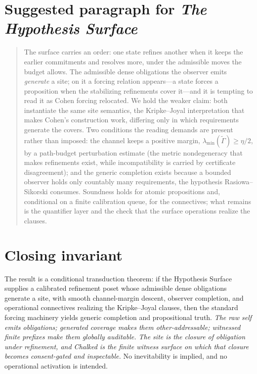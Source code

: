 \documentclass[11pt]{article}
\theoremstyle{definition}
\theoremstyle{remark}
\begin{document}
\section{Suggested paragraph for \emph{The Hypothesis Surface}}

\begin{quote}
The surface carries an order: one state refines another when it keeps the earlier commitments and
resolves more, under the admissible moves the budget allows. The admissible dense obligations the
observer emits \emph{generate} a site; on it a forcing relation appears---a state forces a proposition
when the stabilizing refinements cover it---and it is tempting to read it as Cohen forcing relocated.
We hold the weaker claim: both instantiate the same site semantics, the Kripke--Joyal interpretation
that makes Cohen's construction work, differing only in which requirements generate the covers. Two
conditions the reading demands are present rather than imposed: the channel keeps a positive margin,
$\lambda_{\min}(\tilde\Gamma)\ge\eta/2$, by a path-budget perturbation estimate (the metric nondegeneracy
that makes refinements exist, while incompatibility is carried by certificate disagreement); and the
generic completion exists because a bounded observer holds only countably many requirements, the
hypothesis Rasiowa--Sikorski consumes. Soundness holds for atomic propositions and, conditional on a
finite calibration queue, for the connectives; what remains is the quantifier layer and the check that
the surface operations realize the clauses.
\end{quote}

\section*{Closing invariant}

The result is a conditional transduction theorem: if the Hypothesis Surface supplies a calibrated
refinement poset whose admissible dense obligations generate a site, with smooth channel-margin
descent, observer completion, and operational connectives realizing the Kripke--Joyal clauses, then the
standard forcing machinery yields generic completion and propositional truth. \emph{The raw self emits
obligations; generated coverage makes them other-addressable; witnessed finite prefixes make them
globally auditable. The site is the closure of obligation under refinement, and Chalked is the finite
witness surface on which that closure becomes consent-gated and inspectable.} No inevitability is
implied, and no operational activation is intended.
\end{document}
